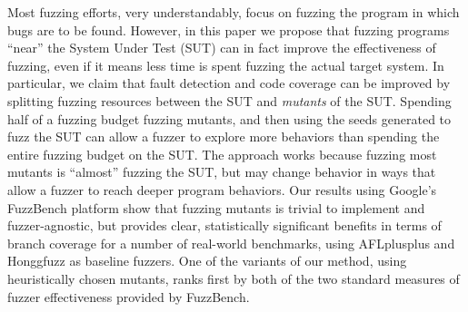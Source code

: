 Most fuzzing efforts, very understandably, focus on fuzzing the program
in which bugs are to be found.  However, in this paper we propose that
fuzzing programs ``near'' the System Under Test (SUT) can in fact
improve the effectiveness of fuzzing, even if it means less time is
spent fuzzing the actual target system.  In particular, we claim that
fault detection and code coverage can be improved by splitting fuzzing
resources between the SUT and \emph{mutants} of the SUT.  Spending
half of a fuzzing budget fuzzing mutants, and then using the seeds
generated to fuzz the SUT can allow a fuzzer to explore more behaviors
than spending the entire fuzzing budget on the SUT.  The approach
works because fuzzing most mutants is ``almost'' fuzzing the SUT, but
may change behavior in ways that allow a fuzzer to reach deeper
program behaviors.  Our results using Google's FuzzBench platform show that fuzzing mutants
is trivial to implement and fuzzer-agnostic, but provides clear, statistically significant
benefits in terms of branch coverage for a number of
real-world benchmarks, using AFLplusplus and Honggfuzz as baseline
fuzzers.  One of the variants of our method, using heuristically
chosen mutants,  ranks first by both of the two standard measures of fuzzer effectiveness
provided by FuzzBench.